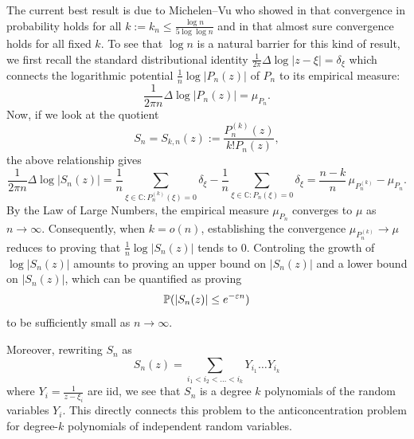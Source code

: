 \documentclass[12pt, reqno]{amsart}
\theoremstyle{plain}
\theoremstyle{definition}
\renewcommand\P{{\mathbb{P}}}
\newcommand{\ep}{\varepsilon}
\begin{document}
 
 \vspace{5mm}
 The current best result is due to Michelen--Vu who showed in  \cite{michelen2024zeros} that convergence in probability holds for all $k:=k_n\le \frac{\log n}{5\log\log n}$ and in \cite{michelen2024almost} that almost sure convergence holds for all fixed $k$. To see that $\log n$ is a natural barrier for this kind of result, we first recall the standard distributional identity $\frac{1}{2\pi}\Delta \log |z-\xi| = \delta_\xi$ which connects the logarithmic potential $\frac{1}{n}\log |P_n(z)|$ of $P_n$ to its empirical measure:  
 $$\frac{1}{2\pi n} \Delta \log |P_n(z)| = \mu_{P_n}.$$
 Now, if we look at the quotient
 \begin{equation}\label{eq:S:xi}
 	S_n =	S_{k, n}(z):= \frac{P^{(k)}_n(z)}{k!P_n(z)},
 \end{equation}
 the above relationship gives
 \[
 \frac{1}{2\pi n} \Delta \log \left| S_n(z) \right|
 = \frac{1}{n} \sum_{\xi \in \mathbb{C} : P_n^{(k)}(\xi) = 0} \delta_\xi
 - \frac{1}{n} \sum_{\xi \in \mathbb{C} : P_n(\xi) = 0} \delta_\xi
 = \frac{n-k}{n} \,\mu_{P_n^{(k)}} - \mu_{P_n}.
 \]
 By the Law of Large Numbers, the empirical measure \(\mu_{P_n}\) converges to \(\mu\) as \(n \to \infty\).
 Consequently, when \(k = o(n)\), establishing the convergence \(\mu_{P_n^{(k)}} \to \mu\) reduces to proving that
 \(\frac{1}{n} \log |S_n(z)|\) tends to \(0\). Controling the growth of $\log |S_n(z)|$ amounts to proving an upper bound on $|S_n(z)|$ and a lower bound on $|S_n(z)|$, which can be quantified as proving
 \begin{equation}
 	\P(|S_n(z)|\le e^{-\ep n}) \notag
 \end{equation}
 to be sufficiently small as $n\to\infty$.
 
 Moreover, rewriting $S_n$ as 
 $$S_n(z)= \sum_{i_1<i_2<\dots<i_k} Y_{i_1}\dots Y_{i_k}$$
 where $Y_i = \frac{1}{z-\xi_i}$ are iid, we see that $S_n$ is a degree $k$ polynomials of the random variables $Y_i$. This directly connects this problem to the anticoncentration problem for degree-$k$ polynomials of independent random variables. 
 
\end{document}
